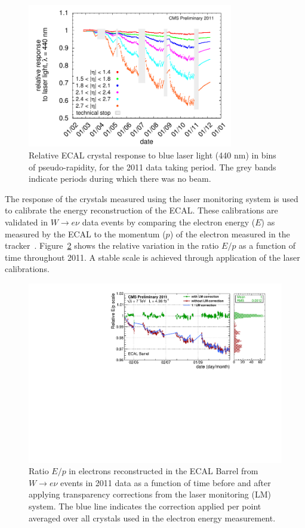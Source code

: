\begin{figure}
	\centering
	\includegraphics[width=0.8\textwidth]{detector/ecal/laser.pdf}
	\caption{Relative ECAL crystal response to blue laser light (440 nm) in bins of pseudo-rapidity, 
	for the 2011 data taking period. The grey bands indicate periods during which there was no beam.}
	\label{fig:trans}
\end{figure}

The response of the crystals measured using the laser monitoring system is used to calibrate 
the energy reconstruction of the ECAL. These calibrations are validated in $W\rightarrow e\nu$ data events
by comparing the electron energy ($E$) as measured by the ECAL to the momentum 
($p$) of the electron measured in the tracker~\citep{CMS-DP-2012-007}. 
Figure~\ref{fig:scaleeop} shows the relative variation in the ratio $E/p$ as a function of time 
throughout 2011. A stable scale is achieved through application of the laser calibrations.

\begin{figure}
	\centering
	\includegraphics[width=\textwidth]{detector/ecal/scaleeop.pdf}
	\caption{Ratio $E/p$ in electrons reconstructed in the ECAL Barrel 
	from $W\rightarrow e\nu$ events in 2011 data as a function of time before 
	and after applying transparency corrections from the laser monitoring (LM) system. 
	The blue line indicates the correction applied per point averaged over all crystals used in the electron
	energy measurement.}
	\label{fig:scaleeop}
\end{figure}

